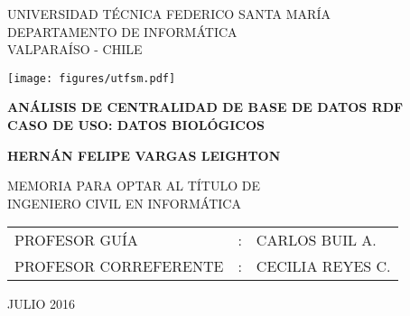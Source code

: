 
\begin{center}
  \begin{spacing}{1}
    {\large UNIVERSIDAD TÉCNICA FEDERICO SANTA MARÍA}\\
    DEPARTAMENTO DE INFORMÁTICA\\
    VALPARAÍSO - CHILE
  \end{spacing}

  \vspace{12mm}
  \texttt{[image: figures/utfsm.pdf]}
  \vspace{15mm}

  \begin{spacing}{1.5} 
    \textbf{\large ANÁLISIS DE CENTRALIDAD DE BASE DE DATOS RDF }\\
    \textbf{\large CASO DE USO: DATOS BIOLÓGICOS }\\
  \end{spacing}

  \vspace{20mm}
  \textbf{\large HERNÁN FELIPE VARGAS LEIGHTON}
  \vspace{12mm}

  \begin{spacing}{1.25} 
    MEMORIA PARA OPTAR AL TÍTULO DE\\
    INGENIERO CIVIL EN INFORMÁTICA
  \end{spacing}

  \vspace{15mm}
  \begin{table}[h]
    \begin{center}
      \begin{tabular}{ l c l }
        PROFESOR GUÍA & : & CARLOS BUIL A.\\
        PROFESOR CORREFERENTE & : & CECILIA REYES C.\\
      \end{tabular}
    \end{center}
  \end{table}

  \vfill
  \large JULIO 2016
\end{center}
